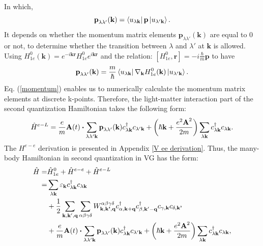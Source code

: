 \documentclass[12pt,english,a4paper]{article}
\newcommand{\dg}{\dagger}
\begin{document}
\quad In which,
	\begin{equation}
		\textbf{p}_{\lambda\lambda'}(\textbf{k}) = \bra{u_{\lambda\textbf{k}}}\textbf{p}\ket{u_{\lambda'\textbf{k}}}.
	\end{equation}
\quad It depends on whether the momentum matrix elements \(\textbf{p}_{\lambda\lambda'}(\textbf{k})\) are equal to 0 or not, to determine whether the transition between \(\lambda\) and \(\lambda'\) at $\textbf{k}$ is allowed. Using $H^0_{1e}(\textbf{k})= e^{-i\textbf{k}\textbf{r}} H^{0}_{1e} e^{i\textbf{k}\textbf{r}}$ and the relation: $[H^0_{1e},\textbf{r}] = -i\frac{\hbar}{m}\textbf{p}$ to have
	\begin{equation}
		\label{momentum}
		\textbf{p}_{\lambda\lambda'}(\textbf{k}) = \frac{m}{\hbar} \bra{u_{\lambda \textbf{k}}} \nabla_{\textbf{k}}H^0_{1e}(\textbf{k}) \ket{u_{\lambda'\textbf{k}}}.
	\end{equation}
\quad Eq. (\ref{momentum}) enables us to numerically calculate the momentum matrix elements at discrete k-points. Therefore, the light-matter interaction part of the second quantization Hamiltonian takes the following form:
	\begin{equation}
		\hat{H}^{e-L} = \frac{e}{m}\textbf{A}(t)\vdot\sum_{\lambda\lambda' \textbf{k}}\textbf{p}_{\lambda \lambda'}(\textbf{k})c^\dg_{\lambda\textbf{k}}c_{\lambda' \textbf{k}} + \bigg(\hbar \textbf{k} + \frac{e^2 \textbf{A}^2}{2m}\bigg)\sum_{\lambda \textbf{k}} c^\dg_{\lambda \textbf{k}} c_{\lambda\textbf{k}}.
	\end{equation}
\quad The $H^{e-e}$ derivation is presented in Appendix \ref{V ee derivation}. Thus, the many-body  Hamiltonian in second quantization in VG has the form:
		\begin{align}
		\label{H with Coulomb in second}
		\hat{H} =& \hat{H}^0_{1e} +\hat{H}^{e-e} + \hat{H}^{e-L} \nonumber \\
		=&  \sum_{\lambda\textbf{k}} \varepsilon_\textbf{k} c_{\lambda\textbf{k}}^\dg c_{\lambda\textbf{k}} \nonumber \\ 
		&+ \frac{1}{2} \sum_{\textbf{k}, \textbf{k}', \textbf{q}} \sum_{\alpha \beta \gamma \delta} W^{\alpha \beta \gamma \delta}_{\textbf{k},\textbf{k'},\textbf{q}} c_{\alpha, \textbf{k}+\textbf{q}}^\dg c_{\beta, \textbf{k}' - \textbf{q}}^\dg c_{\gamma, \textbf{k}}c_{\delta, \textbf{k'}} \nonumber \\
		&+ \frac{e}{m}\textbf{A}(t)\vdot\sum_{\lambda\lambda' \textbf{k}}\textbf{p}_{\lambda \lambda'}(\textbf{k})c^\dg_{\lambda\textbf{k}}c_{\lambda' \textbf{k}} + \bigg(\hbar \textbf{k} + \frac{e^2 \textbf{A}^2}{2m}\bigg)\sum_{\lambda \textbf{k}} c^\dg_{\lambda \textbf{k}} c_{\lambda\textbf{k}},
	\end{align}
\end{document}
